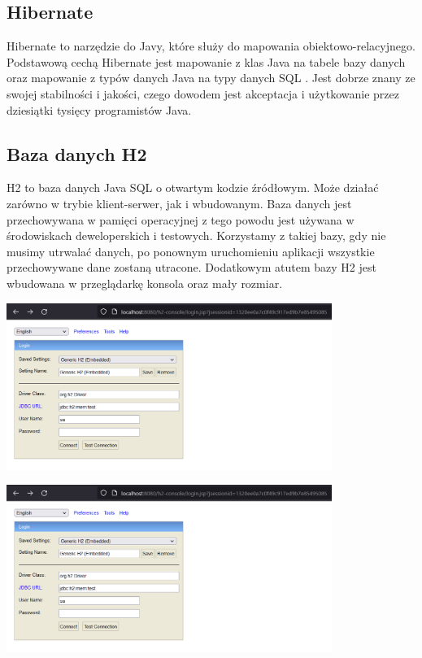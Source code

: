 \documentclass[10pt,a4paper]{report}
\begin{document}
\begin{adjustwidth}{2cm}{2cm}
\subsection{Hibernate}
\begin{minipage}{1\linewidth}
Hibernate to narzędzie do Javy, które służy do mapowania obiektowo-relacyjnego. Podstawową cechą Hibernate jest mapowanie z klas Java na tabele bazy danych oraz mapowanie z typów danych Java na typy danych SQL . Jest dobrze znany ze swojej stabilności i jakości, czego dowodem jest akceptacja i użytkowanie przez dziesiątki tysięcy programistów Java.
\end{minipage}
\subsection{Baza danych H2}
\begin{minipage}{1\linewidth}
H2 to baza danych Java SQL o otwartym kodzie źródłowym. Może działać zarówno w trybie klient-serwer, jak i wbudowanym. Baza danych jest przechowywana w pamięci operacyjnej z tego powodu jest używana w środowiskach deweloperskich i testowych. Korzystamy z takiej bazy, gdy nie musimy utrwalać danych, po ponownym uruchomieniu aplikacji wszystkie przechowywane dane zostaną utracone. Dodatkowym atutem bazy H2 jest wbudowana w przeglądarkę konsola oraz mały rozmiar. \\
\end{minipage}
 \begin{minipage}{\linewidth}
\begin{center}
  \includegraphics[width=400px]{img/h2_console}
\end{center}
\end{minipage}
 \begin{minipage}{\linewidth}
\vspace{0.5cm}
\begin{center}
  \includegraphics[width=400px]{img/h2_console} 

\end{center}
\end{minipage}
\end{adjustwidth}
\end{document}

